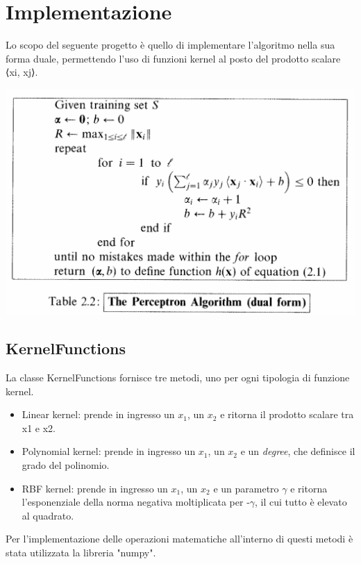 \documentclass{article}
\begin{document}
	\section{Implementazione} 
	Lo scopo del seguente progetto è quello di implementare l'algoritmo nella sua forma duale, permettendo l'uso di funzioni kernel al posto del prodotto
	scalare ⟨xi, xj⟩.
	\begin{center}
		\includegraphics[width=0.7\linewidth]{pseudocodice_perceptron.png}
		\label{The Perceptron Algorithm (dual form)}
	\end{center}
	\subsection{KernelFunctions}
	La classe KernelFunctions fornisce tre metodi, uno per ogni tipologia di funzione kernel. 
	\begin{itemize}
		\item Linear kernel: prende in ingresso un \textit{$x_1$}, un \textit{$x_2$} e ritorna il prodotto scalare tra x1 e x2.
		\item Polynomial kernel: prende in ingresso un \textit{$x_1$}, un \textit{$x_2$} e un \textit{degree}, che definisce il grado del polinomio. 
		\item RBF kernel: prende in ingresso un \textit{$x_1$}, un \textit{$x_2$} e un parametro \textit{$\gamma$} e ritorna l'esponenziale della norma negativa moltiplicata per -\textit{$\gamma$}, il cui tutto è elevato al quadrato.
	\end{itemize}
	Per l'implementazione delle operazioni matematiche all'interno di questi metodi è stata utilizzata la libreria "numpy".
\end{document}
